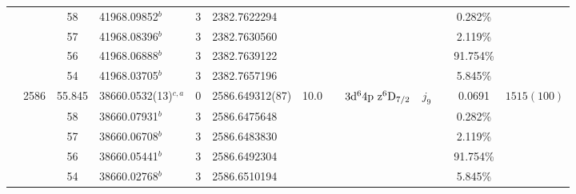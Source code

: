 \begin{table*}
\begin{center}
{\begin{tabular}{:l;l;c;l;c;l;c;l;l;c;c;c;c}
\rowstyle{\itshape}               &        & 58        & 41968.09852$^{b}$                & 3 &  2382.7622294      &      & $                                        $ & $                                        $ & $      $ &              & 0.282\%   & $          $\\
\rowstyle{\itshape}               &        & 57        & 41968.08396$^{b}$                & 3 &  2382.7630560      &      & $                                        $ & $                                        $ & $      $ &              & 2.119\%   & $          $\\
\rowstyle{\itshape}               &        & 56        & 41968.06888$^{b}$                & 3 &  2382.7639122      &      & $                                        $ & $                                        $ & $      $ &              & 91.754\%  & $          $\\
\rowstyle{\itshape}               &        & 54        & 41968.03705$^{b}$                & 3 &  2382.7657196      &      & $                                        $ & $                                        $ & $      $ &              & 5.845\%   & $          $\\
                                  & 2586   & 55.845    & 38660.0532(13)$^{c,a}$           & 0 &   2586.649312(87)  & 10.0 & $                                        $ & $3\rm{d}^64\rm{p~z}^6\rm{D}_{7/2}        $ & $j_{9} $ &              & 0.0691    & $ 1515(100)$\\
\rowstyle{\itshape}               &        & 58        & 38660.07931$^{b}$                & 3 &  2586.6475648      &      & $                                        $ & $                                        $ & $      $ &              & 0.282\%   & $          $\\
\rowstyle{\itshape}               &        & 57        & 38660.06708$^{b}$                & 3 &  2586.6483830      &      & $                                        $ & $                                        $ & $      $ &              & 2.119\%   & $          $\\
\rowstyle{\itshape}               &        & 56        & 38660.05441$^{b}$                & 3 &  2586.6492304      &      & $                                        $ & $                                        $ & $      $ &              & 91.754\%  & $          $\\
\rowstyle{\itshape}               &        & 54        & 38660.02768$^{b}$                & 3 &  2586.6510194      &      & $                                        $ & $                                        $ & $      $ &              & 5.845\%   & $          $\\

\end{tabular}}
\end{center}
\end{table*}
